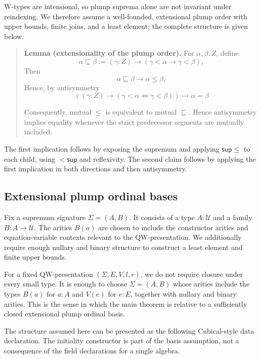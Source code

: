 \documentclass[runningheads]{llncs}
\begin{document}
W-types are intensional, so plump suprema alone are not invariant under reindexing.
We therefore assume a well-founded, extensional plump order with upper bounds,
finite joins, and a least element; the complete structure is given below.

\begin{quote}
\textbf{Lemma (extensionality of the plump order).}
For \(\alpha,\beta:Z\), define
{\small
\[
\alpha\sqsubseteq\beta := (\gamma:Z)\to(\gamma<\alpha\to\gamma<\beta),
\]
}
Then
{\small
\[
\alpha\sqsubseteq\beta\to\alpha\leq\beta,
\]
}
Hence, by antisymmetry
{\small
\[
((\gamma:Z)\to(\gamma<\alpha\iff\gamma<\beta))→\alpha=\beta
\]
}

Consequently, mutual \(\leq\) is equivalent to mutual
\(\sqsubseteq\). Hence antisymmetry implies equality whenever the strict
predecessor segments are mutually included.
\end{quote}

The first implication follows by exposing the supremum and applying
\(\mathsf{sup}\leq\) to each child, using \(\mathsf{<sup}\) and reflexivity.
The second claim follows by applying the first implication
in both directions and then antisymmetry.


\subsection{Extensional plump ordinal
bases}\label{extensional-plump-ordinal-bases}

Fix a supremum signature \(\Sigma=(A,B)\). It consists of a type
\(A:\mathcal{U}\) and a family \(B:A\to\mathcal{U}\). The arities
\(B (a)\) are chosen to
include the constructor arities and equation-variable contexts relevant
to the QW-presentation. We additionally require enough nullary and
binary structure to construct a least element and finite upper bounds.

For a fixed QW-presentation \((\Sigma,E,V,l,r)\), we do not require
closure under every small type. It is enough to choose \(\Sigma=(A,B)\) whose
arities include the types \(B (a)\) for \(a:A\) and \(V (e)\) for
\(e:E\), together with nullary and binary arities. This is the sense in
which the main theorem is relative to a sufficiently closed extensional
plump ordinal basis.

The structure assumed here can be presented as the following Cubical-style
data declaration. The initiality constructor is part of the basis assumption, not a
consequence of the field declarations for a single algebra.
\end{document}
